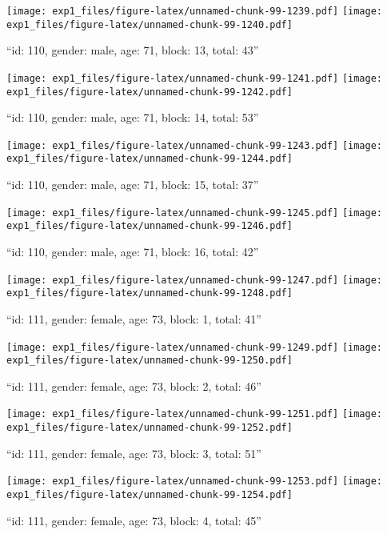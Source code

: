 \documentclass[,]{article}
\begin{document}
\texttt{[image: exp1\_files/figure-latex/unnamed-chunk-99-1239.pdf]}
\texttt{[image: exp1\_files/figure-latex/unnamed-chunk-99-1240.pdf]}

\newpage
[1] 

``id: 110, gender: male, age: 71, block: 13, total: 43''

\texttt{[image: exp1\_files/figure-latex/unnamed-chunk-99-1241.pdf]}
\texttt{[image: exp1\_files/figure-latex/unnamed-chunk-99-1242.pdf]}

\newpage
[1] 

``id: 110, gender: male, age: 71, block: 14, total: 53''

\texttt{[image: exp1\_files/figure-latex/unnamed-chunk-99-1243.pdf]}
\texttt{[image: exp1\_files/figure-latex/unnamed-chunk-99-1244.pdf]}

\newpage
[1] 

``id: 110, gender: male, age: 71, block: 15, total: 37''

\texttt{[image: exp1\_files/figure-latex/unnamed-chunk-99-1245.pdf]}
\texttt{[image: exp1\_files/figure-latex/unnamed-chunk-99-1246.pdf]}

\newpage
[1] 

``id: 110, gender: male, age: 71, block: 16, total: 42''

\texttt{[image: exp1\_files/figure-latex/unnamed-chunk-99-1247.pdf]}
\texttt{[image: exp1\_files/figure-latex/unnamed-chunk-99-1248.pdf]}

\newpage
[1] 

``id: 111, gender: female, age: 73, block: 1, total: 41''

\texttt{[image: exp1\_files/figure-latex/unnamed-chunk-99-1249.pdf]}
\texttt{[image: exp1\_files/figure-latex/unnamed-chunk-99-1250.pdf]}

\newpage
[1] 

``id: 111, gender: female, age: 73, block: 2, total: 46''

\texttt{[image: exp1\_files/figure-latex/unnamed-chunk-99-1251.pdf]}
\texttt{[image: exp1\_files/figure-latex/unnamed-chunk-99-1252.pdf]}

\newpage
[1] 

``id: 111, gender: female, age: 73, block: 3, total: 51''

\texttt{[image: exp1\_files/figure-latex/unnamed-chunk-99-1253.pdf]}
\texttt{[image: exp1\_files/figure-latex/unnamed-chunk-99-1254.pdf]}

\newpage
[1] 

``id: 111, gender: female, age: 73, block: 4, total: 45''
\end{document}
